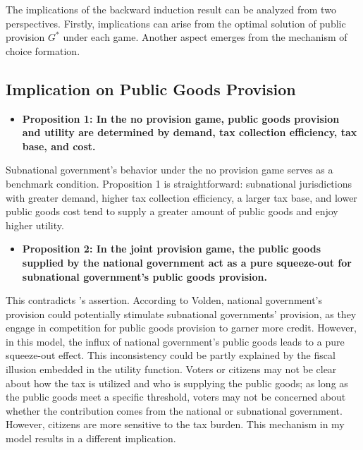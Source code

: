 The implications of the backward induction result can be analyzed from two perspectives. Firstly, implications can arise from the optimal solution of public provision $G^*$ under each game. Another aspect emerges from the mechanism of choice formation.%

\subsection{Implication on Public Goods Provision}

\begin{itemize}
    \item \textbf{Proposition 1: In the no provision game, public goods provision and utility are determined by demand, tax collection efficiency, tax base, and cost.}
\end{itemize}

Subnational government's behavior under the no provision game serves as a benchmark condition. Proposition 1 is straightforward: subnational jurisdictions with greater demand, higher tax collection efficiency, a larger tax base, and lower public goods cost tend to supply a greater amount of public goods and enjoy higher utility.

\begin{itemize}
    \item \textbf{Proposition 2: In the joint provision game, the public goods supplied by the national government act as a pure squeeze-out for subnational government's public goods provision.}
\end{itemize}

This contradicts \Textcite{volden2007intergovernmental}'s assertion. According to Volden, national government's provision could potentially stimulate subnational governments' provision, as they engage in competition for public goods provision to garner more credit. However, in this model, the influx of national government's public goods leads to a pure squeeze-out effect. This inconsistency could be partly explained by the fiscal illusion embedded in the utility function. Voters or citizens may not be clear about how the tax is utilized and who is supplying the public goods; as long as the public goods meet a specific threshold, voters may not be concerned about whether the contribution comes from the national or subnational government. However, citizens are more sensitive to the tax burden. This mechanism in my model results in a different implication.

